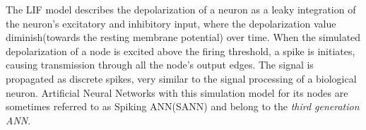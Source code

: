 	The LIF model describes the depolarization of a neuron as a leaky integration of the neuron's excitatory and inhibitory input, where the depolarization value diminish(towards the resting membrane potential) over time.
	When the simulated depolarization of a node is excited above the firing threshold, a spike is initiates, causing transmission through all the node's output edges. %
	The signal is propagated as discrete spikes, very similar to the signal processing of a biological neuron\cite{Kunkle02pulsedneural}.
	Artificial Neural Networks with this simulation model for its nodes are sometimes referred to as Spiking ANN(SANN) and belong to the \emph{third generation ANN}\cite{Maass97networksof}. %
	

